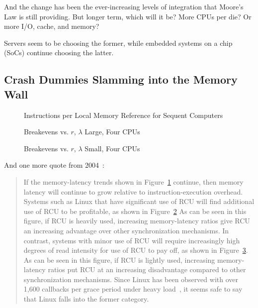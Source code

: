 And the change has been the ever-increasing levels of integration
that Moore's Law is still providing.
But longer term, which will it be?
More CPUs per die?
Or more I/O, cache, and memory?

Servers seem to be choosing the former, while embedded systems on a chip
(SoCs) continue choosing the latter.

\subsection{Crash Dummies Slamming into the Memory Wall}
\label{sec:future:Crash Dummies Slamming into the Memory Wall}

\begin{figure}[tbp]
\centering
\epsfxsize=3in
\caption{Instructions per Local Memory Reference for Sequent Computers}
\label{fig:future:Instructions per Local Memory Reference for Sequent Computers}
\end{figure}

\begin{figure}[htbp]
\centering
\epsfxsize=3in
\caption{Breakevens vs. $r$, $\lambda$ Large, Four CPUs}
\label{fig:future:Breakevens vs. r, lambda Large, Four CPUs}
\end{figure}

\begin{figure}[htbp]
\centering
\epsfxsize=3in
\caption{Breakevens vs. $r$, $\lambda$ Small, Four CPUs}
\label{fig:future:Breakevens vs. r, Worst-Case lambda, Four CPUs}
\end{figure}

And one more quote from 2004~\cite{PaulEdwardMcKenneyPhD}:

\begin{quote}
	If the memory-latency trends shown in
	Figure~\ref{fig:future:Instructions per Local Memory Reference for Sequent Computers}
	continue, then memory latency will continue to grow relative
	to instruction-execution overhead.
	Systems such as Linux that have significant use of RCU will find
	additional use of RCU to be profitable, as shown in
	Figure~\ref{fig:future:Breakevens vs. r, lambda Large, Four CPUs}
	As can be seen in this figure, if RCU is heavily used, increasing
	memory-latency ratios give RCU an increasing advantage over other
	synchronization mechanisms.
	In contrast, systems with minor
	use of RCU will require increasingly high degrees of read intensity
	for use of RCU to pay off, as shown in
	Figure~\ref{fig:future:Breakevens vs. r, Worst-Case lambda, Four CPUs}.
	As can be seen in this figure, if RCU is lightly used,
	increasing memory-latency ratios
	put RCU at an increasing disadvantage compared to other synchronization
	mechanisms.
	Since Linux has been observed with over 1,600 callbacks per grace
	period under heavy load~\cite{Sarma04c},
	it seems safe to say that Linux falls into the former category.
\end{quote}

